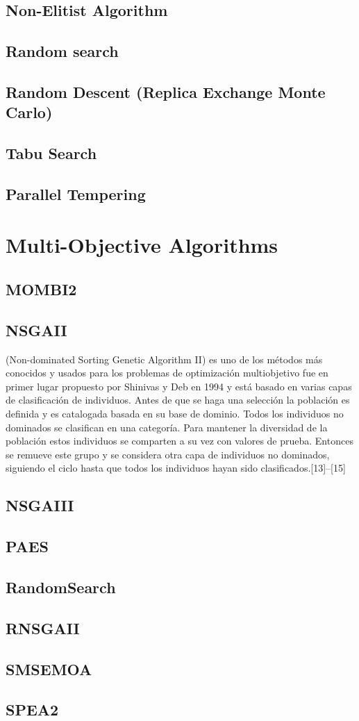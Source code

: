 \subsection{Non-Elitist Algorithm}

\subsection{Random search} 
\subsection{Random Descent (Replica Exchange Monte Carlo)} 
\subsection{Tabu Search} 
\subsection{Parallel Tempering} 

\section{Multi-Objective Algorithms}

\subsection{MOMBI2}
\subsection{NSGAII}
(Non-dominated Sorting Genetic Algorithm II) es uno de los métodos más conocidos y usados para los problemas de optimización multiobjetivo fue en primer lugar propuesto por Shinivas y Deb en 1994 y está basado en varias capas de clasificación de individuos. Antes de que se haga una selección la población es definida y es catalogada basada en su base de dominio. Todos los individuos no dominados se clasifican en una categoría. Para mantener la diversidad de la población estos individuos se comparten a su vez con valores de prueba. Entonces se remueve este grupo y se considera otra capa de individuos no dominados, siguiendo el ciclo hasta que todos los individuos hayan sido clasificados.[13]–[15]\\
\subsection{NSGAIII}
\subsection{PAES}
\subsection{RandomSearch}
\subsection{RNSGAII}
\subsection{SMSEMOA}
\subsection{SPEA2}
